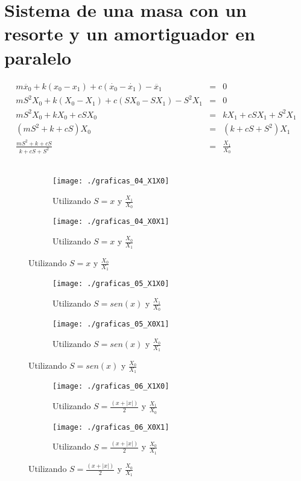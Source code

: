 \documentclass[12pt,spanish,lettersize]{article}
\begin{document}
\section{Sistema de una masa con un resorte y un amortiguador en paralelo}
\begin{eqnarray}
m\ddot{x_0}+k(x_0-x_1)+c(\dot{x_0}-\dot{x_1})-\ddot{x_1}&=&0\\
\nonumber mS^2X_0+k(X_0-X_1)+c(SX_0-SX_1)-S^2X_1&=&0\\
\nonumber mS^2X_0+kX_0+cSX_0&=&kX_1+cSX_1+S^2X_1\\
(mS^2+k+cS)X_0&=&(k+cS+S^2)X_1\\
\frac{mS^2+k+cS}{k+cS+S^2}&=&\frac{X_1}{X_0}
\end{eqnarray}\\
\begin{figure}[h]
\begin{subfigure}{0.45\textwidth}
\texttt{[image: ./graficas\_04\_X1X0]}
\caption{Utilizando $S=x$ y $\frac{X_1}{X_0}$}
\end{subfigure}
\begin{subfigure}{0.45\textwidth}
\texttt{[image: ./graficas\_04\_X0X1]}
\caption{Utilizando $S=x$ y $\frac{X_0}{X_1}$}
\end{subfigure}
\end{figure}
\begin{figure}[h]
\begin{subfigure}{0.45\textwidth}
\texttt{[image: ./graficas\_05\_X1X0]}
\caption{Utilizando $S=sen(x)$ y $\frac{X_1}{X_0}$}
\end{subfigure}
\begin{subfigure}{0.45\textwidth}
\texttt{[image: ./graficas\_05\_X0X1]}
\caption{Utilizando $S=sen(x)$ y $\frac{X_0}{X_1}$}
\end{subfigure}
\end{figure}
\begin{figure}[h]
\begin{subfigure}{0.45\textwidth}
\texttt{[image: ./graficas\_06\_X1X0]}
\caption{Utilizando $S=\frac{(x+|x|)}{2}$ y $\frac{X_1}{X_0}$}
\end{subfigure}
\begin{subfigure}{0.45\textwidth}
\texttt{[image: ./graficas\_06\_X0X1]}
\caption{Utilizando $S=\frac{(x+|x|)}{2}$ y $\frac{X_0}{X_1}$}
\end{subfigure}
\end{figure}
\end{document}
